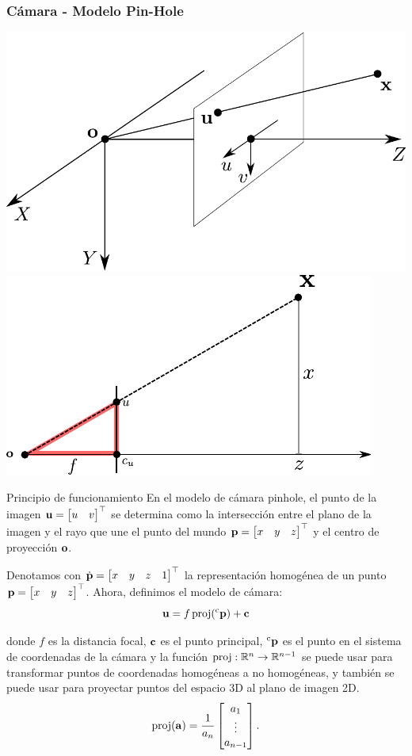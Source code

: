 \begin{frame}
    \frametitle{Cámara - Modelo Pin-Hole}
    
    
    \includegraphics[width=0.4\columnwidth]{images/camera/pinhole_camera_model.pdf}
    \includegraphics[width=0.4\columnwidth]{images/camera/pinhole_camera_model2.pdf}
    \footnotesize
    
    \begin{block}{Principio de funcionamiento}
    	En el modelo de cámara pinhole, el punto de la imagen $\boldsymbol{\mathbf{u}}=\begin{bmatrix}u & v\end{bmatrix}^{\top}$ se determina como la intersección entre el plano de la imagen y el rayo que une el punto del mundo $\boldsymbol{\mathbf{p}} =\begin{bmatrix}x & y & z\end{bmatrix}^{\top}$ y el centro de proyección $\boldsymbol{\mathbf{o}}$.
    \end{block}
  
    Denotamos con $\dot{\boldsymbol{\mathbf{p}}}=\begin{bmatrix}x & y & z & 1\end{bmatrix}^{\top}$ la representación homogénea de un punto $\boldsymbol{\mathbf{p}}=\begin{bmatrix}x & y & z\end{bmatrix}^{\top}$. Ahora, definimos el modelo de cámara:
    \begin{equation*}
        \boldsymbol{\mathbf{u}}=f\operatorname{proj}(\prescript{\mathrm{\mathrm{c}}}{}{\boldsymbol{\mathbf{p}}})+\boldsymbol{\mathbf{c}}
    \end{equation*}

    donde $f$ es la distancia focal, $\boldsymbol{\mathbf{c}}$ es el punto principal, $\prescript{\mathrm{\mathrm{c}}}{}{\boldsymbol{\mathbf{p}}}$ es el punto en el sistema de coordenadas de la cámara y la función $\operatorname{proj}:\mathbb{R}^{n}\rightarrow\mathbb{R}^{n- 1}$ se puede usar para transformar puntos de coordenadas homogéneas a no homogéneas, y también se puede usar para proyectar puntos del espacio 3D al plano de imagen 2D.
    \begin{equation*}
        \operatorname{proj}(\boldsymbol{\mathbf{a}})=
            \frac{1}{a_{n}}\begin{bmatrix}a_{1}\\
            \vdots\\
            a_{n-1}
        \end{bmatrix}.
    \end{equation*}


\end{frame}
